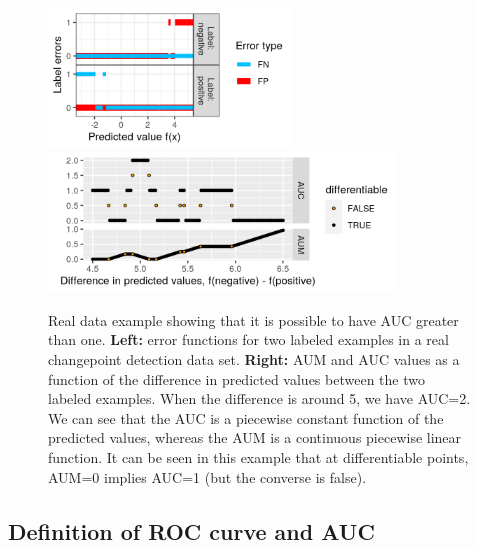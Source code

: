 \documentclass{article}
\begin{document}
\begin{figure}[t]
\vskip 0.2in
\begin{center}
\includegraphics[height=3.7cm]{figure-aum-convexity-profiles.png}
\includegraphics[height=3.7cm]{figure-aum-convexity.png}
\vskip -0.5cm
\caption{Real data example showing that it is possible to have AUC greater than one.
\textbf{Left:} error functions for two labeled examples in a real changepoint detection data set.
\textbf{Right:} AUM and AUC values as a function of the difference in predicted values between the two labeled examples.
When the difference is around 5, we have AUC=2.
We can see that the AUC is a piecewise constant function of the predicted values, whereas the AUM is a continuous piecewise linear function.
It can be seen in this example that at differentiable points, AUM=0 implies AUC=1 (but the converse is false).
}
\label{fig:aum-convexity}
\end{center}
\vskip -0.2in
\end{figure}

\subsection{Definition of ROC curve and AUC}
\end{document}
